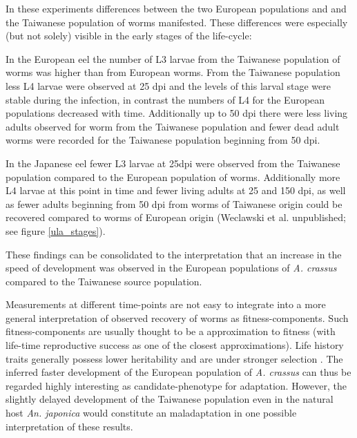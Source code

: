 In these experiments differences between the two European populations
and and the Taiwanese population of worms manifested. These
differences were especially (but not solely) visible in the early
stages of the life-cycle:

In the European eel the number of L3 larvae from the Taiwanese
population of worms was higher than from European worms. From the
Taiwanese population less L4 larvae were observed at 25 dpi and the
levels of this larval stage were stable during the infection, in
contrast the numbers of L4 for the European populations decreased with
time. Additionally up to 50 dpi there were less living adults observed
for worm from the Taiwanese population and fewer dead adult worms were
recorded for the Taiwanese population beginning from 50 dpi.

In the Japanese eel fewer L3 larvae at 25dpi were observed from the
Taiwanese population compared to the European population of
worms. Additionally more L4 larvae at this point in time and fewer
living adults at 25 and 150 dpi, as well as fewer adults beginning
from 50 dpi from worms of Taiwanese origin could be recovered compared
to worms of European origin (Weclawski et al. unpublished; see figure
\ref{ula_stages}).

These findings can be consolidated to the interpretation that an
increase in the speed of development was observed in the European
populations of \textit{A. crassus} compared to the Taiwanese source
population.

Measurements at different time-points are not easy to integrate into a
more general interpretation of observed recovery of worms as
fitness-components. Such fitness-components are usually thought to be
a approximation to fitness (with life-time reproductive success as one
of the closest approximations). Life history traits generally possess
lower heritability and are under stronger selection
\cite{pmid3316130}. The inferred faster development of the European
population of \textit{A. crassus} can thus be regarded highly
interesting as candidate-phenotype for adaptation. However, the
slightly delayed development of the Taiwanese population even in the
natural host \textit{An. japonica} would constitute an maladaptation
\cite{pmid21708731} in one possible interpretation of these results.

